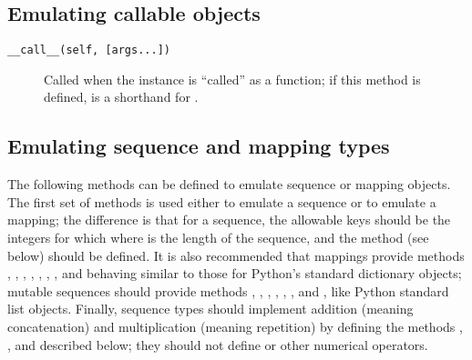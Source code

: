 \subsection{Emulating callable objects}

\begin{description}

\item[{\tt __call__(self, [args...])}]
Called when the instance is ``called'' as a function; if this method
is defined,  is a shorthand for
.

\end{description}


\subsection{Emulating sequence and mapping types}

The following methods can be defined to emulate sequence or mapping
objects.  The first set of methods is used either to emulate a
sequence or to emulate a mapping; the difference is that for a
sequence, the allowable keys should be the integers  for which
 where  is the length of the
sequence, and the method  (see below) should be
defined.  It is also recommended that mappings provide methods
, , ,
, , , ,
 and  behaving similar to those for
Python's standard dictionary objects; mutable sequences should provide
methods , , ,
, , , 
and , like Python standard list objects.  Finally,
sequence types should implement addition (meaning concatenation) and
multiplication (meaning repetition) by defining the methods
, ,  and
 described below; they should not define
 or other numerical operators.

